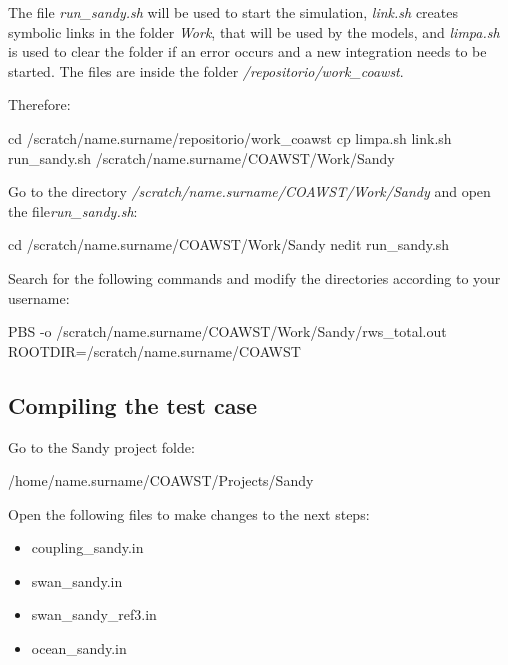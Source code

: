 \noindent The file \textit{run\_sandy.sh} will be used to start the simulation, \textit{link.sh} creates symbolic links in the folder \textit{Work}, 
that will be used by the models, and \textit{limpa.sh} is used to clear the folder if an error occurs and a new integration needs to be started. The files 
are inside the folder \textit{/repositorio/work\_coawst}.
\bigskip

\noindent Therefore:

\bigskip

\begin{bashcode}
cd /scratch/name.surname/repositorio/work_coawst
cp limpa.sh link.sh run_sandy.sh /scratch/name.surname/COAWST/Work/Sandy
\end{bashcode}
\bigskip

\noindent Go to the directory \textit{/scratch/name.surname/COAWST/Work/Sandy} and open the file\textit{run\_sandy.sh}:
\bigskip

\begin{bashcode}
cd /scratch/name.surname/COAWST/Work/Sandy
nedit run_sandy.sh
\end{bashcode}
\bigskip

\noindent Search for the following commands and modify the directories according to your username:
\bigskip

\begin{bashcode}
PBS -o /scratch/name.surname/COAWST/Work/Sandy/rws_total.out
ROOTDIR=/scratch/name.surname/COAWST
\end{bashcode}
\bigskip


\subsection{Compiling the test case}
\bigskip

\noindent Go to the Sandy project folde:
\bigskip

\begin{bashcode}
/home/name.surname/COAWST/Projects/Sandy
\end{bashcode}
\bigskip

\noindent Open the following files to make changes to the next steps:
\bigskip

\begin{itemize}
\item coupling\_sandy.in
\item swan\_sandy.in
\item swan\_sandy\_ref3.in
\item ocean\_sandy.in
\end{itemize}
\bigskip

